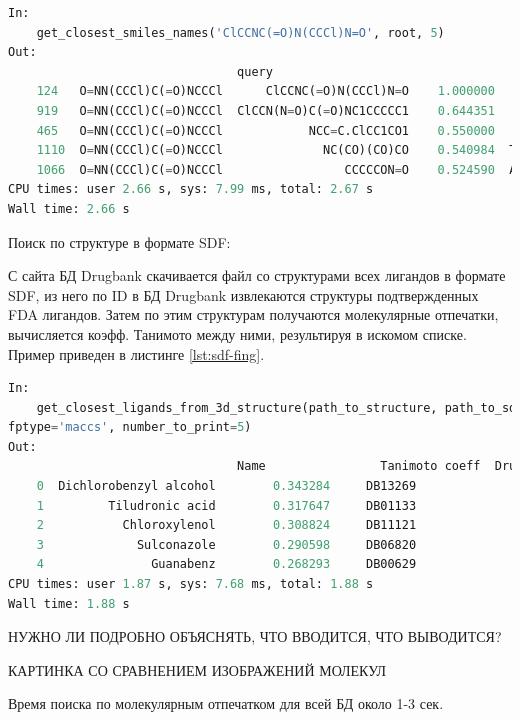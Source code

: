 \documentclass[a4paper,14pt]{article}         %
\begin{document}
\begin{lstlisting}[language=Python, label={lst:smiles-fing}, caption={Сходство лигандов по текстовым молекулярным отпечаткам с помощью ПМ RDkit для входных данных~--- SMILES структуры молекулы.}]
In:
	get_closest_smiles_names('ClCCNC(=O)N(CCCl)N=O', root, 5)
Out:
								query       							smiles  			similarity     	 name
	124   O=NN(CCCl)C(=O)NCCCl      ClCCNC(=O)N(CCCl)N=O    1.000000    Carmustine
	919   O=NN(CCCl)C(=O)NCCCl  ClCCN(N=O)C(=O)NC1CCCCC1    0.644351     Lomustine
	465   O=NN(CCCl)C(=O)NCCCl            NCC=C.ClCC1CO1    0.550000     Sevelamer
	1110  O=NN(CCCl)C(=O)NCCCl              NC(CO)(CO)CO    0.540984  Tromethamine
	1066  O=NN(CCCl)C(=O)NCCCl                 CCCCCON=O    0.524590  Amyl Nitrite
CPU times: user 2.66 s, sys: 7.99 ms, total: 2.67 s
Wall time: 2.66 s
\end{lstlisting}

Поиск по структуре в формате SDF:

С сайта БД Drugbank скачивается файл со структурами всех лигандов в формате SDF, из него по ID в БД Drugbank извлекаются структуры подтвержденных FDA лигандов. Затем по этим структурам получаются молекулярные отпечатки, вычисляется коэфф. Танимото между ними, результируя в искомом списке. Пример приведен в листинге \ref{lst:sdf-fing}.

\begin{lstlisting}[language=Python, label={lst:sdf-fing}, caption={Сходство лигандов по топологическим молекулярным отпечаткам с помощью ПМ Open Babel для входных данных~--- SDF структуры молекулы.}]
In: 
	get_closest_ligands_from_3d_structure(path_to_structure, path_to_sdf_approved, root,
fptype='maccs', number_to_print=5)
Out:
								Name  				Tanimoto coeff 	Drugbank ID  	Fingerprint_type
	0  Dichlorobenzyl alcohol        0.343284     DB13269              fp2
	1         Tiludronic acid        0.317647     DB01133              fp2
	2           Chloroxylenol        0.308824     DB11121              fp2
	3             Sulconazole        0.290598     DB06820              fp2
	4               Guanabenz        0.268293     DB00629              fp2
CPU times: user 1.87 s, sys: 7.68 ms, total: 1.88 s
Wall time: 1.88 s
\end{lstlisting}
\color{orange} НУЖНО ЛИ ПОДРОБНО ОБЪЯСНЯТЬ, ЧТО ВВОДИТСЯ, ЧТО ВЫВОДИТСЯ?
\color{black}

\color{orange} КАРТИНКА СО СРАВНЕНИЕМ ИЗОБРАЖЕНИЙ МОЛЕКУЛ
\color{black}

Время поиска по молекулярным отпечатком для всей БД около 1-3 сек.
\end{document}
